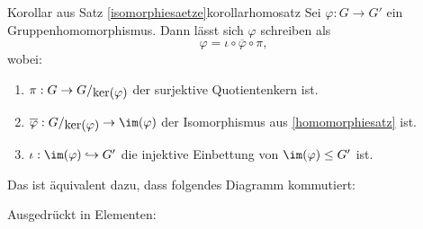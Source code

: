 \begin{korollar}{Korollar aus Satz \ref{isomorphiesaetze}}{korollarhomosatz}
Sei $\varphi: G \to G'$ ein Gruppenhomomorphismus. Dann lässt sich $\varphi$ schreiben als
\begin{equation}
\varphi = \iota \circ \overline{\varphi} \circ \pi,
\end{equation}
wobei:
\begin{enumerate}
\item $\pi:G \to \quotient{G}{\ker (\varphi)}$ der surjektive Quotientenkern ist.
\item $\overline{\varphi}: \quotient{G}{\ker (\varphi)} \to \im (\varphi)$ der Isomorphismus aus \ref{homomorphiesatz} ist.
\item $\iota: \im (\varphi) \hookrightarrow G'$ die injektive Einbettung von $\im (\varphi) \leq G'$ ist.
\end{enumerate}
Das ist äquivalent dazu, dass folgendes Diagramm kommutiert:
\begin{center}
\end{center}
Ausgedrückt in Elementen:
\begin{center}
\end{center}
\end{korollar}
